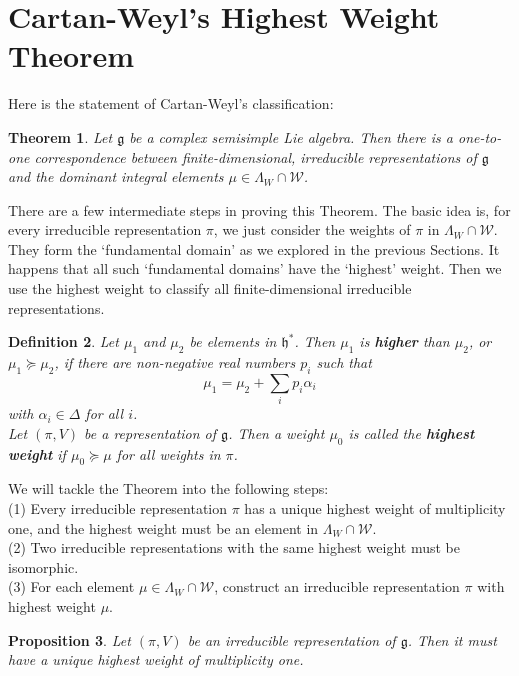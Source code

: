 \documentclass[11pt]{book}
\newtheorem{theorem}{Theorem}[section]
\newtheorem{proposition}[theorem]{Proposition}
\newtheorem{definition}[theorem]{Definition}
\newcommand{\mc}[1]{\mathcal{#1}}
\newcommand{\mf}[1]{\mathfrak{#1}}
\begin{document}
\section{Cartan-Weyl's Highest Weight Theorem}
Here is the statement of Cartan-Weyl's classification:
\begin{theorem}
Let $\mf{g}$ be a complex semisimple Lie algebra. Then there is a one-to-one correspondence between finite-dimensional, irreducible representations of $\mf{g}$ and the dominant integral elements $\mu \in \Lambda_W \cap \mc{W}$.
\end{theorem}
There are a few intermediate steps in proving this Theorem. The basic idea is, for every irreducible representation $\pi$, we just consider the weights of $\pi$ in $\Lambda_W \cap \mc{W}$. They form the `fundamental domain' as we explored in the previous Sections. It happens that all such `fundamental domains' have the `highest' weight. Then we use the highest weight to classify all finite-dimensional irreducible representations.
\begin{definition} \label{higher}
Let $\mu_1$ and $\mu_2$ be elements in $\mf{h}^*$. Then $\mu_1$ is \textbf{higher} than $\mu_2$, or $\mu_1 \succeq \mu_2$, if there are non-negative real numbers $p_i$ such that
$$\mu_1 = \mu_2 + \sum_i p_i \alpha_i$$
with $\alpha_i \in \Delta$ for all $i$. \\
Let $(\pi,V)$ be a representation of $\mf{g}$. Then a weight $\mu_0$ is called the \textbf{highest weight} if $\mu_0 \succeq \mu$ for all weights in $\pi$.
\end{definition}
We will tackle the Theorem into the following steps:\\
(1) Every irreducible representation $\pi$ has a unique highest weight of multiplicity one, and the highest weight must be an element in $\Lambda_W \cap \mc{W}$.\\
(2) Two irreducible representations with the same highest weight must be isomorphic.\\
(3) For each element $\mu \in \Lambda_W \cap \mc{W}$, construct an irreducible representation $\pi$ with highest weight $\mu$.\\
\begin{proposition}
Let $(\pi,V)$ be an irreducible representation of $\mf{g}$. Then it must have a unique highest weight of multiplicity one.
\end{proposition}
\end{document}
